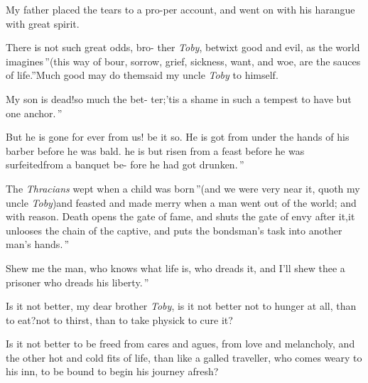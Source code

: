 \documentclass{article}
\begin{document}
\tsk My father placed the tears to a pro-\break per account, and went
on with his harangue with great spirit.

\indent\lqq There is not such great odds, bro-\break
\lqq ther \textit{Toby}, betwixt good and evil, as\break
\lqq the world imagines\,”\tsh (this way of
\sic\break
\lqq bour, sorrow, grief, sickness, want, and\break
\lqq woe, are the sauces of life.”\tsk Much\break
good may do them\tsk said my uncle \textit{Toby}\break
to himself.\tsh

\indent\lqq My son is dead!\tsk so much the bet-\break
\lqq ter;\tsk ’tis a shame in such a tempest to\break
\lqq have but one anchor.\,”

\indent\lqq But he is gone for ever from us!\tsk\break
\lqq be it so. He is got from under the\break
\lqq hands of his barber before he was bald.\break
\lqq \tsk he is but risen from a feast before \break
\lqq he was surfeited\tsk from a banquet be-\break
\lqq fore he had got drunken.\,”

\indent\lqq The \textit{Thracians} wept when a child\break
\lqq was born\,”\tsk (and we were very near\break
\lqq it, quoth my uncle \textit{Toby})\tsk \lqq and feasted\break
\lqq and made merry when a man went \break
\lqq out of the world; and with reason.\tsk{}
\lqq Death opens the gate of fame, and\break
\lqq shuts the gate of envy after it,\tsk it\break
\lqq unlooses the chain of the captive, and \break
\lqq puts the bondsman’s task into another\break
\lqq man’s hands.\,”

\indent\lqq Shew me the man, who knows what\break
\lqq life is, who dreads it, and I’ll shew thee\break
\lqq a prisoner who dreads his liberty.\,”

Is it not better, my dear brother \textit{Toby},\break
{}\break
\tsk is it not better not to hunger at all, than to eat?\tsk not to thirst, than to
take physick to cure it?

Is it not better to be freed from cares and agues, from love and
melancholy, and the other hot and cold fits of life, than like
a galled traveller, who comes weary to his inn, to be bound to
begin his journey afresh?
\end{document}
